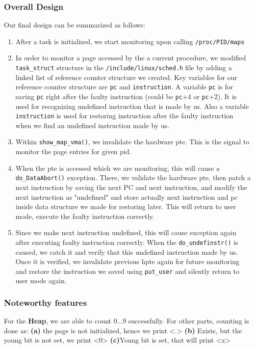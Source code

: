 \documentclass[]{article}
\begin{document}
\subsubsection{Overall Design}\label{Overall Design}
Our final design can be summarized as follows:
\begin{enumerate}
\def\labelenumi{\arabic{enumi}.}
  
  \item After a task is initialized, we start monitoring upon calling \texttt{/proc/PID/maps}
  \item In order to monitor a page accessed by the a current procedure, we modified \texttt{task\_struct} structure in the \texttt{/include/linux/sched.h} file by adding a linked list of reference counter structure we created. Key variables for our reference counter structure are \texttt{pc} and \texttt{instruction}. A variable \texttt{pc} is for  saving \texttt{pc} right after the faulty instruction (could be \texttt{pc}+4 or \texttt{pc}+2). It is used for recognizing undefined instruction that is made by us. Also a variable \texttt{instruction} is used for restoring instruction after the faulty instruction when we find an undefined instruction made by us.
  \item  Within \texttt{show\_map\_vma()}, we invalidate the hardware pte. This is the signal to monitor the page entries for given pid.  
  \item When the pte is accessed which we are monitoring, this will cause a
  \texttt{do\_DataAbort()} exception.  There, we validate the hardware pte, then patch a next instruction by saving the next PC and next instruction, and modify the next instruction as "undefined" and store actually next instruction and pc inside data structure we made for restoring later.  This will return to user mode, execute the faulty instruction correctly.
  \item Since we make next instruction undefined, this will cause exception again after executing faulty instruction correctly. When the \texttt{do\_undefinstr()} is caused, we catch it and verify that this undefined instruction made by us. Once it is verified, we invalidate previous hpte again for future monitoring and restore the instruction we saved using \texttt{put\_user} and silently return to user mode again.
\end{enumerate}
\subsubsection{Noteworthy features}\label{{Noteworthy Features}}
  For the \textbf{Heap}, we are able to count 0...9 successfully. For other parts, counting is done as: \textbf{(a)} the page is not initialized, hence we print <.>  \textbf{(b)} Exists, but the young bit is not set,  we print <0> \textbf{(c)}Young bit is set, that will print <x>
\end{document}

